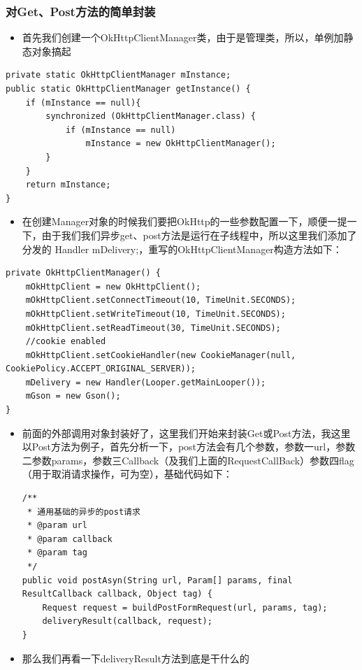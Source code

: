 \documentclass[9pt, b5paper]{article}
\begin{document}
\subsubsection{对Get、Post方法的简单封装　}
\label{sec-13-3-2}
\begin{itemize}
\item 首先我们创建一个OkHttpClientManager类，由于是管理类，所以，单例加静态对象搞起
\end{itemize}
\begin{verbatim}
private static OkHttpClientManager mInstance;
public static OkHttpClientManager getInstance() {
    if (mInstance == null){
        synchronized (OkHttpClientManager.class) {
            if (mInstance == null) 
                mInstance = new OkHttpClientManager();
        }
    }
    return mInstance;
}
\end{verbatim}
\begin{itemize}
\item 在创建Manager对象的时候我们要把OkHttp的一些参数配置一下，顺便一提一下，由于我们我们异步get、post方法是运行在子线程中，所以这里我们添加了分发的 Handler mDelivery;，重写的OkHttpClientManager构造方法如下：
\end{itemize}
\begin{verbatim}
private OkHttpClientManager() {
    mOkHttpClient = new OkHttpClient();
    mOkHttpClient.setConnectTimeout(10, TimeUnit.SECONDS);
    mOkHttpClient.setWriteTimeout(10, TimeUnit.SECONDS);
    mOkHttpClient.setReadTimeout(30, TimeUnit.SECONDS);
    //cookie enabled
    mOkHttpClient.setCookieHandler(new CookieManager(null, CookiePolicy.ACCEPT_ORIGINAL_SERVER));
    mDelivery = new Handler(Looper.getMainLooper());
    mGson = new Gson();
}
\end{verbatim}
\begin{itemize}
\item 前面的外部调用对象封装好了，这里我们开始来封装Get或Post方法，我这里以Post方法为例子，首先分析一下，post方法会有几个参数，参数一url，参数二参数params，参数三Callback（及我们上面的RequestCallBack）参数四flag（用于取消请求操作，可为空），基础代码如下：
\begin{verbatim}
/**
 * 通用基础的异步的post请求
 * @param url
 * @param callback
 * @param tag
 */
public void postAsyn(String url, Param[] params, final ResultCallback callback, Object tag) {
    Request request = buildPostFormRequest(url, params, tag);
    deliveryResult(callback, request);
}
\end{verbatim}
\item 那么我们再看一下deliveryResult方法到底是干什么的
\end{itemize}
\end{document}
